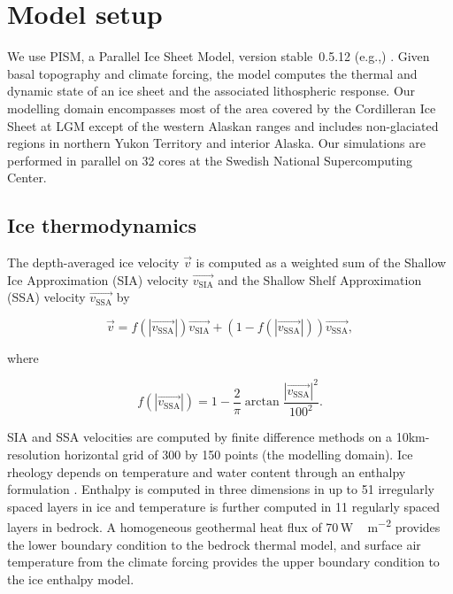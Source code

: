 \section{Model setup}
\label{sec:model}

We use PISM, a Parallel Ice Sheet Model, version stable~0.5.12 (e.g.,) \citep{bueler-brown-2009,winkelmann-etal-2011,aschwanden-etal-2012,web:pism}. Given basal topography and climate forcing, the model computes the thermal and dynamic state of an ice sheet and the associated lithospheric response. Our modelling domain encompasses most of the area covered by the Cordilleran Ice Sheet at LGM except of the western Alaskan ranges and includes non-glaciated regions in northern Yukon Territory and interior Alaska. Our simulations are performed in parallel on 32 cores at the Swedish National Supercomputing Center.

\subsection{Ice thermodynamics}

The depth-averaged ice velocity $\vec{v}$ is computed as a weighted sum of the Shallow Ice Approximation (SIA) velocity $\vec{v_{\mathrm{SIA}}}$ and the Shallow Shelf Approximation (SSA) velocity $\vec{v_{\mathrm{SSA}}}$ \citep{bueler-brown-2009} by

\begin{equation}
	\vec{v} = f(|\vec{v_{\mathrm{SSA}}}|)\vec{v_{\mathrm{SIA}}}
  + (1-f(|\vec{v_{\mathrm{SSA}}}|))\vec{v_{\mathrm{SSA}}},
\end{equation}

where

\begin{equation}
	f(|\vec{v_{\mathrm{SSA}}}|) = 1
	- \frac{2}{\pi}\arctan{\frac{|\vec{v_{\mathrm{SSA}}}|^2}{100^2}}.
\end{equation}

SIA and SSA velocities are computed by finite difference methods on a 10km-resolution horizontal grid of 300 by 150 points (the modelling domain). Ice rheology depends on temperature and water content through an enthalpy formulation \citep{aschwanden-blatter-2009,aschwanden-etal-2012}. Enthalpy is computed in three dimensions in up to 51 irregularly spaced layers in ice and temperature is further computed in 11 regularly spaced layers in bedrock. A homogeneous geothermal heat flux of 70\,\unit{W\,m^{-2}} provides the lower boundary condition to the bedrock thermal model, and surface air temperature from the climate forcing provides the upper boundary condition to the ice enthalpy model.

